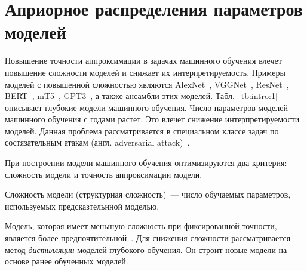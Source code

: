 \chapter{Априорное распределения параметров моделей}

Повышение точности аппроксимации в задачах машинного обучения влечет повышение сложности моделей и снижает их интерпретируемость.
Примеры моделей с повышенной сложностью являются AlexNet~\cite{Krizhevsky2012}, VGGNet~\cite{Simonyan2014}, ResNet~\cite{Kaiming2015}, BERT~\cite{Devlin2018, Vaswani2017}, mT5~\cite{Linting2021}, GPT3~\cite{Brown2020}, а также ансамбли этих моделей.
Табл.~\ref{tb:intro:1} описывает глубокие модели машинного обучения.
Число параметров моделей машинного обучения с годами растет.
Это влечет снижение интерпретируемости моделей.
Данная проблема рассматривается в специальном классе задач по состязательным атакам (англ. adversarial attack)~\cite{Zheng2020}.

\begin{table}[h!]
\caption{Анализ роста числа параметров при развитии моделей глубокого обучения}
\label{tb:intro:1}
\begin{center}
\end{center}
\end{table}


При построении модели машинного обучения оптимизируются два критерия: сложность модели и точность аппроксимации модели.
\begin{definition}
Сложность модели (структурная сложность)~--- число обучаемых параметров, используемых предсказтельнной моделью.
\end{definition}
Модель, которая имеет меньшую сложность при фиксированной точности, является более предпочтительной~\cite{bachteev2018}. Для снижения сложности рассматривается метод \textit{дистилляции} моделей глубокого обучения. Он строит новые модели на основе ранее обученных моделей.

